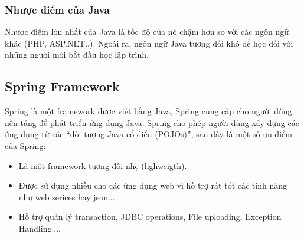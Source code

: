 \documentclass[a4paper]{article}
\begin{document}
\subsubsection{Nhược điểm của Java}
Nhược điểm lớn nhất của Java là tốc độ của nó chậm hơn so với các ngôn ngữ khác (PHP, ASP.NET..). Ngoài ra, ngôn ngữ Java tương đối khó để học đối với những người mới bắt
đầu học lập trình.
\subsection{Spring Framework }
Spring là một framework được viết bằng Java, Spring cung cấp cho người dùng nền tảng để phát triển ứng dụng Java. Spring cho phép người dùng xây dựng các ứng dụng từ các
“đối tượng Java cổ điển (POJOs)”, sau đây là một số ưu điểm của Spring:
   \begin{itemize}
     \item Là một framework tương đối nhẹ (lighweigth).
     \item Được sử dụng nhiều cho các ứng dụng web vì hỗ trợ rất tốt các tính năng như web serices hay json...
     \item Hỗ trợ quản lý transaction, JDBC operations, File uploading, Exception Handling....
   \end{itemize}
\end{document}
